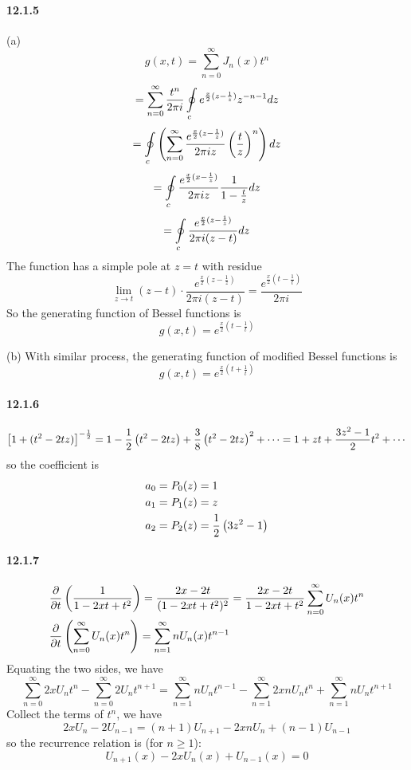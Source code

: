 \documentclass[a4paper]{article}
\begin{document}
\paragraph{12.1.5}
(a)
\[
g(x,t)=\sum_{n=0}^\infty J_n(x)t^n
\]
\[
=\sum_{n=0}^\infty\frac{t^n}{2\pi i}\oint\displaylimits_c e^{\frac{x}{2}(z-\frac{1}{z})}z^{-n-1}dz
\]
\[
=\oint\displaylimits_c\left(\sum_{n=0}^\infty\frac{e^{\frac{x}{2}{(z-\frac{1}{z})}}}{2\pi iz}\left(\frac{t}{z}\right)^n \right)dz
\]
\[
=\oint\displaylimits_c\frac{e^{\frac{x}{2}{(x-\frac{1}{z})}}}{2\pi iz}\frac{1}{1-\frac{t}{z}}dz
\]
\[
=\oint\displaylimits_c\frac{e^{\frac{x}{2}{(z-\frac{1}{z})}}}{2\pi i(z-t)}dz
\]
The function has a simple pole at $z=t$ with residue
\[
\lim_{z\to t}(z-t)\cdot\frac{e^{\frac{x}{2}{(z-\frac{1}{z})}}}{2\pi i(z-t)}=\frac{e^{\frac{x}{2}{(t-\frac{1}{t})}}}{2\pi i}
\]
So the generating function of Bessel functions is
\[
g(x,t)=e^{\frac{x}{2}{(t-\frac{1}{t})}}
\]

(b)
With similar process, the generating function of modified Bessel functions is
\[
g(x,t)=e^{\frac{x}{2}{(t+\frac{1}{t})}}
\]

\paragraph{12.1.6}
\[
\left[1+(t^2-2tz)\right]^{-\frac{1}{2}}=1-\frac{1}{2}\left(t^2-2tz\right)+\frac{3}{8}\left(t^2-2tz\right)^2+\cdots=1+zt+\frac{3z^2-1}{2}t^2+\cdots
\]
so the coefficient is
\begin{align*}
    & a_0=P_0(z)=1\\
    & a_1=P_1(z)=z\\
    & a_2=P_2(z)=\frac{1}{2}\left(3z^2-1\right)
\end{align*}

\paragraph{12.1.7}
\begin{align*}
    & \frac{\partial}{\partial t}\left(\frac{1}{1-2xt+t^2}\right)=\frac{2x-2t}{(1-2xt+t^2)^2}=\frac{2x-2t}{1-2xt+t^2}\sum_{n=0}^\infty U_n(x)t^n\\
    & \frac{\partial}{\partial t}\left(\sum_{n=0}^\infty U_n(x)t^n\right)=\sum_{n=1}^\infty nU_n(x)t^{n-1}
\end{align*}
Equating the two sides, we have
\[
\sum_{n=0}^\infty 2xU_nt^n-\sum_{n=0}^\infty2U_nt^{n+1}=\sum_{n=1}^\infty nU_nt^{n-1}-\sum_{n=1}^\infty 2xnU_nt^n+\sum_{n=1}^\infty nU_nt^{n+1}
\]
Collect the terms of $t^n$, we have
\[
2xU_n-2U_{n-1}=(n+1)U_{n+1}-2xnU_n+(n-1)U_{n-1}
\]
so the recurrence relation is (for $n\geq1$):
\[
U_{n+1}(x)-2xU_n(x)+U_{n-1}(x)=0
\]
\end{document}
